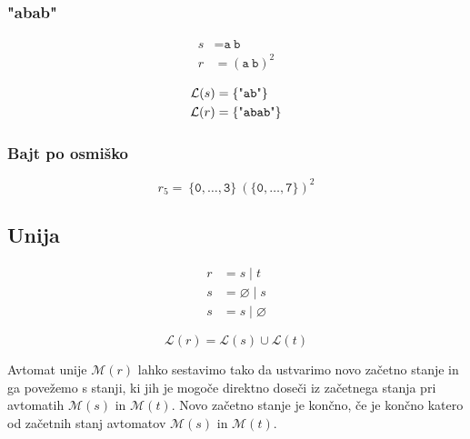 \documentclass{article}
\newcommand{\Empty}{\varnothing}
\newcommand{\Language}[1]{\mathcal{L}(#1)}
\newcommand{\Automaton}[1]{\mathcal{M}(#1)}
\newcommand{\Str}[1]{\text{\textquotedbl\texttt{#1}\textquotedbl}}
\newcommand{\Char}[1]{\texttt{#1}}
\newcommand{\Seq}{\ }
\newcommand{\Union}{\mathrel{|}}
\begin{document}
\subsubsection{"abab"}

\begin{align*}
  s &= \Char{a} \Seq \Char{b} \\
  r &= (\Char{a} \Seq \Char{b})^2
\end{align*}

\begin{align*}
  \Language{s} &= \{\Str{ab}\} \\
  \Language{r} &= \{\Str{abab}\} \\
\end{align*}

\subsubsection{Bajt po osmiško}
\begin{equation*}
  r_5 = \Seq \{\Char{0}, \dots, \Char{3}\} \Seq (\{\Char{0}, \dots, \Char{7}\})^2
\end{equation*}

\subsection{Unija}
\begin{align*}
  r &= s \Union t \\
  s &= \Empty \Union s \\
  s &= s \Union \Empty
\end{align*}

\begin{equation*}
  \Language{r} = \Language{s} \cup \Language{t}
\end{equation*}

Avtomat unije $\Automaton{r}$ lahko sestavimo tako da ustvarimo novo začetno stanje in ga povežemo s stanji, ki jih je mogoče direktno doseči iz začetnega stanja pri avtomatih $\Automaton{s}$ in $\Automaton{t}$.
Novo začetno stanje je končno, če je končno katero od začetnih stanj avtomatov $\Automaton{s}$ in $\Automaton{t}$.
\end{document}
